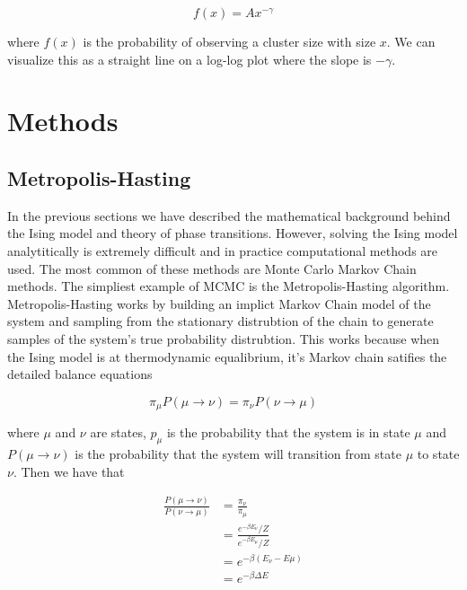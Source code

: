 \documentclass{article}
\begin{document}
\begin{equation}
    f(x) = A x^{-\gamma}
\end{equation}

where $f(x)$ is the probability of observing a cluster size with size $x$. We can visualize this as a straight line
on a log-log plot where the slope is $-\gamma$.

\section{Methods}
\label{Methods}

\subsection{Metropolis-Hasting}
In the previous sections we have described the mathematical background behind the Ising model and theory of phase transitions.
However, solving the Ising model analytitically is extremely difficult and in practice computational methods are used. The most common of these methods 
are Monte Carlo Markov Chain methods. The simpliest example of MCMC is the Metropolis-Hasting algorithm. Metropolis-Hasting works by building 
an implict Markov Chain model of the system and sampling from the stationary distrubtion of the chain to generate samples of the system's true probability
distrubtion. This works because when the Ising model is at thermodynamic equalibrium, it's Markov chain satifies the detailed balance equations

\begin{equation}
    \pi_{\mu} P(\mu \rightarrow \nu) = \pi_{\nu} P(\nu \rightarrow \mu)
\end{equation}

where $\mu$ and $\nu$ are states, $p_{\mu}$ is the probability that the system is in state $\mu$ and $P(\mu \rightarrow \nu)$
is the probability that the system will transition from state $\mu$ to state $\nu$. Then we have that 

\begin{align}
    \frac{P(\mu \rightarrow \nu)}{P(\nu \rightarrow \mu)}
    &= \frac{\pi_{\nu}}{\pi_{\mu}} \\
    &= \frac{e^{-\beta E_{\nu}} / Z}{e^{-\beta E_{\mu}} / Z} \\
    &= e^{-\beta(E_{\nu} - E{\mu})} \\
    &= e^{-\beta \Delta E}
\end{align}
\end{document}
